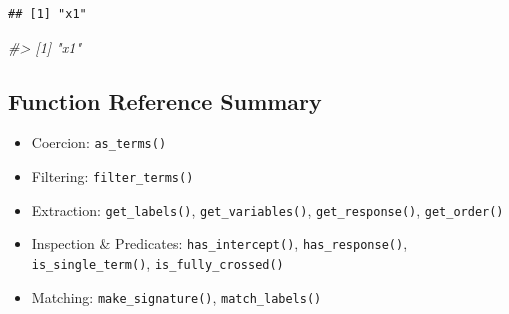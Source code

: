 \documentclass[
]{article}
\newenvironment{Shaded}{\begin{snugshade}}{\end{snugshade}}
\newcommand{\CommentTok}[1]{\textcolor[rgb]{0.56,0.35,0.01}{\textit{#1}}}
\providecommand{\tightlist}{%
  \setlength{\itemsep}{0pt}\setlength{\parskip}{0pt}}
\begin{document}
\begin{verbatim}
## [1] "x1"
\end{verbatim}

\begin{Shaded}
\begin{Highlighting}[]
\CommentTok{\#\textgreater{} [1] "x1"}
\end{Highlighting}
\end{Shaded}

\subsection{Function Reference
Summary}\label{function-reference-summary}

\begin{itemize}
\tightlist
\item
  Coercion: \texttt{as\_terms()}
\item
  Filtering: \texttt{filter\_terms()}
\item
  Extraction: \texttt{get\_labels()}, \texttt{get\_variables()},
  \texttt{get\_response()}, \texttt{get\_order()}
\item
  Inspection \& Predicates: \texttt{has\_intercept()},
  \texttt{has\_response()}, \texttt{is\_single\_term()},
  \texttt{is\_fully\_crossed()}
\item
  Matching: \texttt{make\_signature()}, \texttt{match\_labels()}
\end{itemize}
\end{document}

